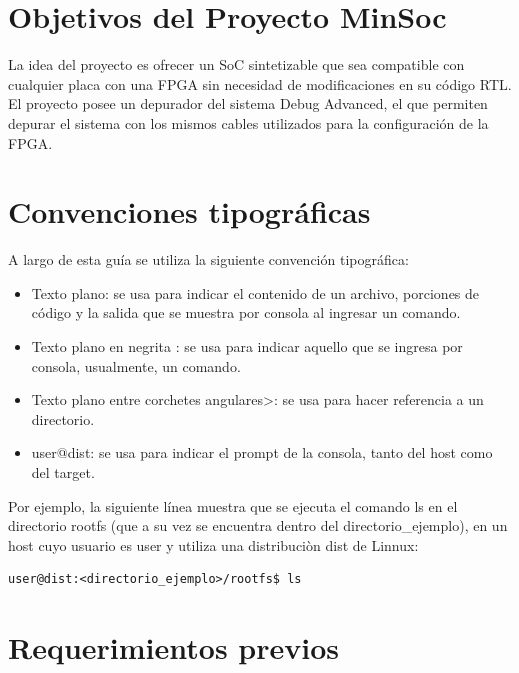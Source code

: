 
\section{Objetivos del Proyecto MinSoc}

La idea del proyecto es ofrecer un SoC sintetizable que sea  compatible con cualquier placa con una FPGA sin necesidad de modificaciones en su código RTL. El proyecto posee un depurador del sistema Debug Advanced,  el que permiten depurar el sistema con los mismos cables utilizados para la configuración de la FPGA. 

\section{Convenciones tipográficas}

A largo de esta guía se utiliza la siguiente convención tipográfica: 

\begin{itemize}
\item Texto plano: se usa para indicar el contenido de un archivo, porciones de código y la salida que se muestra por consola al ingresar un comando.
\item Texto plano en negrita : se usa para indicar aquello que se ingresa por consola, usualmente, un comando. 
\item Texto plano entre corchetes angulares>: se usa para hacer referencia a un directorio. 
\item user@dist: se usa para indicar el prompt de la consola, tanto del host como del target. 
\end{itemize} 
 
Por ejemplo, la siguiente línea muestra que se ejecuta el comando ls en el directorio rootfs (que a  su vez se encuentra dentro del directorio\_ejemplo), en un host cuyo usuario es user y utiliza una distribuciòn dist de Linnux:


\begin{lstlisting}[breaklines]
user@dist:<directorio_ejemplo>/rootfs$ ls
\end{lstlisting}

\section{Requerimientos previos}

